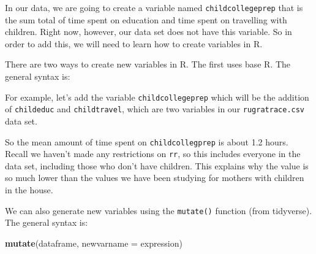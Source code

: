 \documentclass[
]{book}
\newenvironment{Shaded}{\begin{snugshade}}{\end{snugshade}}
\newcommand{\AttributeTok}[1]{\textcolor[rgb]{0.13,0.29,0.53}{#1}}
\newcommand{\DecValTok}[1]{\textcolor[rgb]{0.00,0.00,0.81}{#1}}
\newcommand{\FunctionTok}[1]{\textcolor[rgb]{0.13,0.29,0.53}{\textbf{#1}}}
\newcommand{\NormalTok}[1]{#1}
\newcommand{\OtherTok}[1]{\textcolor[rgb]{0.56,0.35,0.01}{#1}}
\newcommand{\SpecialCharTok}[1]{\textcolor[rgb]{0.81,0.36,0.00}{\textbf{#1}}}
\newcommand{\StringTok}[1]{\textcolor[rgb]{0.31,0.60,0.02}{#1}}
\begin{document}
In our data, we are going to create a variable named \texttt{childcollegeprep} that is the sum total of time spent on education and time spent on travelling with children. Right now, however, our data set does not have this variable. So in order to add this, we will need to learn how to create variables in R.

There are two ways to create new variables in R. The first uses base R. The general syntax is:

\begin{Shaded}
\end{Shaded}

For example, let's add the variable \texttt{childcollegeprep} which will be the addition of \texttt{childeduc} and \texttt{childtravel}, which are two variables in our \texttt{rugratrace.csv} data set.

\begin{Shaded}
\end{Shaded}

So the mean amount of time spent on \texttt{childcollegprep} is about 1.2 hours. Recall we haven't made any restrictions on \texttt{rr}, so this includes everyone in the data set, including those who don't have children. This explains why the value is so much lower than the values we have been studying for mothers with children in the house.

We can also generate new variables using the \texttt{mutate()} function (from tidyverse). The general syntax is:

\begin{Shaded}
\begin{Highlighting}[]
\FunctionTok{mutate}\NormalTok{(dataframe, }\AttributeTok{newvarname =}\NormalTok{ expression)}
\end{Highlighting}
\end{Shaded}
\end{document}

